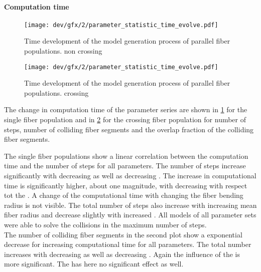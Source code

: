 \paragraph{Computation time}
% 
\begin{figure}[p]
\centering
\texttt{[image: dev/gfx/2/parameter\_statistic\_time\_evolve.pdf]}
\caption[Time development parallel]{Time development of the model generation process of parallel fiber populations. non crossing}
\label{fig:timeDevelopmentNone}
\end{figure}
% 
\begin{figure}[p]
\centering
\texttt{[image: dev/gfx/2/parameter\_statistic\_time\_evolve.pdf]}
\caption[Time development parallel]{Time development of the model generation process of parallel fiber populations. crossing }
\label{fig:timeDevelopmentCross}
\end{figure}
% 
The change in computation time of the parameter series are shown in \cref{fig:timeDevelopmentNone} for the single fiber population and in \cref{fig:timeDevelopmentCross} for the crossing fiber population for number of steps, number of colliding fiber segments and the overlap fraction of the colliding fiber segments.
\par
% 
The single fiber populations show a linear correlation between the computation time and the number of steps for all parameters.
The number of steps increase significantly with decreasing \segLengthFactor{} as well as decreasing \fiberRadiusMean{}.
The increase in computational time is significantly higher, about one magnitude, with decreasing \fiberRadiusMean{} with respect tot the \segLengthFactor{}.
A change of the computational time with changing the fiber bending radius \segRadiusFactor{} is not visible.
The total number of steps also increase with increasing mean fiber radius \fiberRadiusMean{} and decrease slightly with increased \segLengthFactor{}.
All models of all parameter sets were  able to solve the collisions in the maximum number of steps.
\\
The number of colliding fiber segments in the second plot show a exponential decrease for increasing computational time for all parameters.
The total number increases with decreasing \segLengthFactor{} as well as decreasing \fiberRadiusMean{}.
Again the influence of the \fiberRadiusMean{} is more significant.
The \segRadiusFactor{} has here no significant effect as well.
